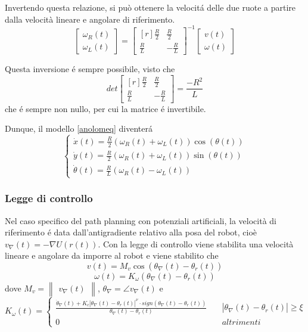 \documentclass[14pt,a4paper]{extarticle}
\begin{document}
Invertendo questa relazione, si può ottenere la velocitá delle due ruote a partire dalla velocità lineare e angolare di riferimento.
\begin{equation}
\label{wrwl}
\begin{bmatrix}
\omega_R(t) \\
\omega_L(t)
\end{bmatrix}
=
\begin{bmatrix*}[r]
\frac{R}{2} & \frac{R}{2} \\
\frac{R}{L} & -\frac{R}{L}
\end{bmatrix*}^{-1}
\begin{bmatrix}
v(t) \\
\omega(t)
\end{bmatrix}
\end{equation}

Questa inversione é sempre possibile, visto che
\[det\begin{bmatrix*}[r]
\frac{R}{2} & \frac{R}{2} \\
\frac{R}{L} & -\frac{R}{L}
\end{bmatrix*} = \frac{-R^2}{L}\] che é sempre non nullo, per cui la matrice é invertibile.

Dunque, il modello \ref{anolomeq} diventerá
\begin{equation}
\label{DDeq}
\begin{cases}
\dot{x}(t) = \frac{R}{2} \left( \omega_R(t)+\omega_L(t) \right) \cos(\theta(t)) \\
\dot{y}(t) = \frac{R}{2} \left( \omega_R(t)+\omega_L(t) \right)\sin(\theta(t)) \\
\dot{\theta}(t) = \frac{R}{L} \left( \omega_R(t)-\omega_L(t) \right)
\end{cases}
\end{equation} 

\subsubsection{Legge di controllo \cite{dalfonso}}

Nel caso specifico del path planning con potenziali artificiali, la velocità di riferimento é data dall'antigradiente relativo alla posa del robot, cioè \(v_\nabla(t) = -\nabla U(r(t))\). Con la legge di controllo viene stabilita una velocità lineare e angolare da imporre al robot e viene stabilito che
\begin{equation}
v(t) = M_v \cos(\theta_{\nabla}(t) - \theta_r(t))
\end{equation} 
\begin{equation}
\omega(t) = K_{\omega}(\theta_{\nabla}(t) - \theta_r(t))
\end{equation} dove \(M_v=\begin{Vmatrix}v_{\nabla}(t)\end{Vmatrix}\), \(\theta_{\nabla}=\angle v_{\nabla}(t)\) e 
\[K_{\omega}(t)= \begin{cases}
\frac{\dot{\theta}_{\nabla}(t) + K_c|\theta_{\nabla}(t)-\theta_r(t)|^{\nu} \cdot sign(\theta_{\nabla}(t) - \theta_r(t))}{\theta_{\nabla}(t) - \theta_r(t)} \quad &|\theta_{\nabla}(t)-\theta_r(t)| \geq \xi \\
0 \quad &altrimenti
\end{cases}\]
\end{document}
